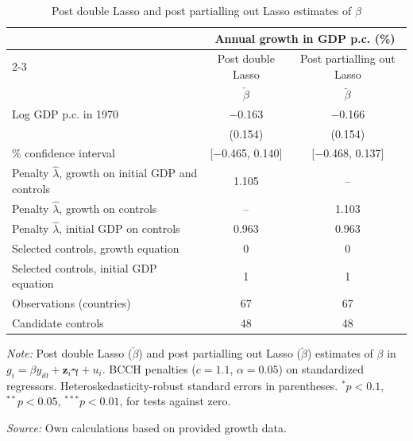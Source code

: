 \begin{table}[!htbp]
\centering
\caption{Post double Lasso and post partialling out Lasso estimates of $\beta$}
\label{tab:pdl_ppol_est}
\begin{threeparttable}
\begin{tabular}{lcc}
\toprule
 & \multicolumn{2}{c}{Annual growth in GDP p.c. (\%)} \\
\cmidrule(lr){2-3}
 & Post double Lasso & Post partialling out Lasso \\
 & $\check{\beta}$ & $\breve{\beta}$ \\
\midrule
Log GDP p.c. in 1970 & $-$0.163 & $-$0.166 \\
 & (0.154) & (0.154) \\
\addlinespace
95\% confidence interval & [$-$0.465, 0.140] & [$-$0.468, 0.137] \\
\midrule
Penalty $\hat{\lambda}$, growth on initial GDP and controls & 1.105 & -- \\
Penalty $\hat{\lambda}$, growth on controls & -- & 1.103 \\
Penalty $\hat{\lambda}$, initial GDP on controls & 0.963 & 0.963 \\
Selected controls, growth equation & 0 & 0 \\
Selected controls, initial GDP equation & 1 & 1 \\
\midrule
Observations (countries) & 67 & 67 \\
Candidate controls & 48 & 48 \\
\bottomrule
\end{tabular}
\begin{tablenotes}[flushleft]
\footnotesize
\item \textit{Note:} Post double Lasso ($\check{\beta}$) and post partialling out Lasso ($\breve{\beta}$) estimates of $\beta$ in $g_i = \beta y_{i0} + \mathbf{z}_i\boldsymbol{\gamma} + u_i$. BCCH penalties ($c=1.1$, $\alpha=0.05$) on standardized regressors. Heteroskedasticity-robust standard errors in parentheses. $^{*}p<0.1$, $^{**}p<0.05$, $^{***}p<0.01$, for tests against zero.
\item \textit{Source:} Own calculations based on provided growth data.
\end{tablenotes}
\end{threeparttable}
\end{table}